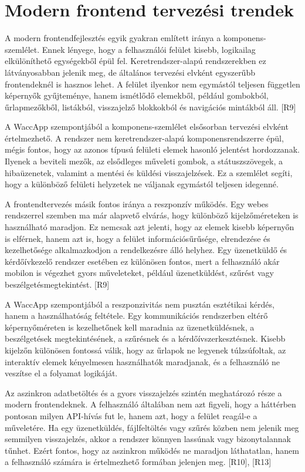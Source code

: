 \section{Modern frontend tervezési trendek}

A modern frontendfejlesztés egyik gyakran említett iránya a komponens-szemlélet. Ennek lényege, hogy a felhasználói felület kisebb, logikailag elkülöníthető egységekből épül fel. Keretrendszer-alapú rendszerekben ez látványosabban jelenik meg, de általános tervezési elvként egyszerűbb frontendeknél is hasznos lehet. A felület ilyenkor nem egymástól teljesen független képernyők gyűjteménye, hanem ismétlődő elemekből, például gombokból, űrlapmezőkből, listákból, visszajelző blokkokból és navigációs mintákból áll. [R9]

A WaccApp szempontjából a komponens-szemlélet elsősorban tervezési elvként értelmezhető. A rendszer nem keretrendszer-alapú komponensrendszerre épül, mégis fontos, hogy az azonos típusú felületi elemek hasonló jelentést hordozzanak. Ilyenek a beviteli mezők, az elsődleges műveleti gombok, a státuszszövegek, a hibaüzenetek, valamint a mentési és küldési visszajelzések. Ez a szemlélet segíti, hogy a különböző felületi helyzetek ne váljanak egymástól teljesen idegenné.

A frontendtervezés másik fontos iránya a reszponzív működés. Egy webes rendszerrel szemben ma már alapvető elvárás, hogy különböző kijelzőméreteken is használható maradjon. Ez nemcsak azt jelenti, hogy az elemek kisebb képernyőn is elférnek, hanem azt is, hogy a felület információsűrűsége, elrendezése és kezelhetősége alkalmazkodjon a rendelkezésre álló helyhez. Egy üzenetküldő és kérdőívkezelő rendszer esetében ez különösen fontos, mert a felhasználó akár mobilon is végezhet gyors műveleteket, például üzenetküldést, szűrést vagy beszélgetésmegtekintést. [R9]

A WaccApp szempontjából a reszponzivitás nem pusztán esztétikai kérdés, hanem a használhatóság feltétele. Egy kommunikációs rendszerben eltérő képernyőméreten is kezelhetőnek kell maradnia az üzenetküldésnek, a beszélgetések megtekintésének, a szűrésnek és a kérdőívszerkesztésnek. Kisebb kijelzőn különösen fontossá válik, hogy az űrlapok ne legyenek túlzsúfoltak, az interaktív elemek kényelmesen használhatók maradjanak, és a felhasználó ne veszítse el a folyamat logikáját.

Az aszinkron adatbetöltés és a gyors visszajelzés szintén meghatározó része a modern frontendeknek. A felhasználó általában nem azt figyeli, hogy a háttérben pontosan milyen API-hívás fut le, hanem azt, hogy a felület reagál-e a műveletére. Ha egy üzenetküldés, fájlfeltöltés vagy szűrés közben nem jelenik meg semmilyen visszajelzés, akkor a rendszer könnyen lassúnak vagy bizonytalannak tűnhet. Ezért fontos, hogy az aszinkron működés ne maradjon láthatatlan, hanem a felhasználó számára is értelmezhető formában jelenjen meg. [R10], [R13]

